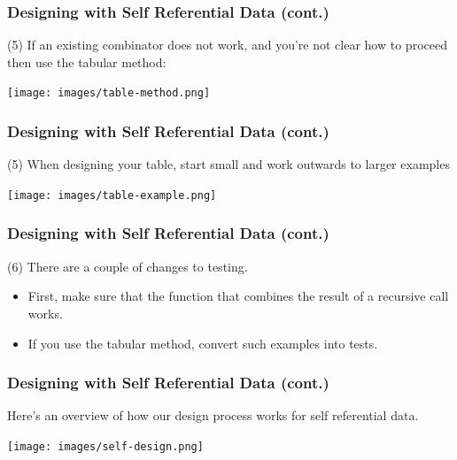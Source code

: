 \documentclass{beamer}
\begin{document}
\begin{frame}
  \frametitle{Designing with Self Referential Data (cont.)}
  (5) If an existing combinator does not work, and you're not clear how to proceed then use the tabular method:
  \begin{center}
    \texttt{[image: images/table-method.png]}
  \end{center}
   
\end{frame}

\begin{frame}
  \frametitle{Designing with Self Referential Data (cont.)}
  (5) When designing your table, start small and work outwards to larger examples
  \begin{center}
    \texttt{[image: images/table-example.png]}
  \end{center}
   
\end{frame}

\begin{frame}
  \frametitle{Designing with Self Referential Data (cont.)}
  (6) There are a couple of changes to testing.
  \begin{itemize}
  \item<2-> First, make sure that the function that combines the result of a recursive call works.
  \item<3-> If you use the tabular method, convert such examples into tests. 
  \end{itemize}
\end{frame}

\begin{frame}
  \frametitle{Designing with Self Referential Data (cont.)}
  Here's an overview of how our design  process works for self referential data.
  \begin{center}
    \texttt{[image: images/self-design.png]}
  \end{center}
\end{frame}

\end{document}
